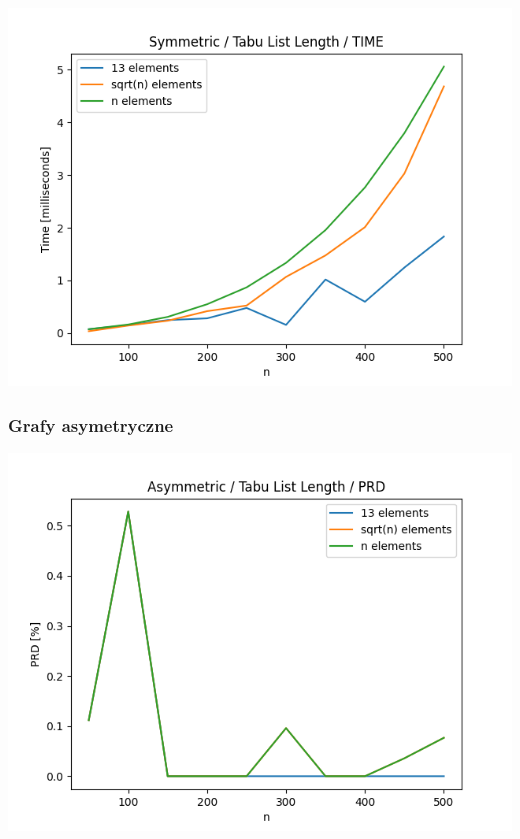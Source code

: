 \documentclass{article}
\begin{document}
\begin{center}
\includegraphics[width=\textwidth, 
                   height = 0.4\textheight, 
                   keepaspectratio]
                  {plots/tabu_symmetric_time} 
\end{center}

\subsubsection{Grafy asymetryczne}

\begin{center}
\includegraphics[width=\textwidth, 
                   height = 0.4\textheight, 
                   keepaspectratio]
                  {plots/tabu_asymmetric_prd} 
\end{center}
\end{document}
